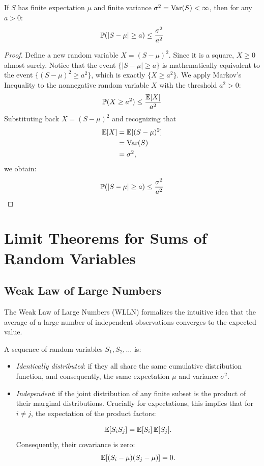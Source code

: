 \begin{theorem}
If $S$ has finite expectation $\mu$ and finite variance $\sigma^2 = \operatorname{Var}(S) < \infty$, then for any $a > 0$:
\begin{equation}
\mathbb{P}(|S - \mu| \geq a) \leq \frac{\sigma^2}{a^2}
\end{equation}

\end{theorem}

\begin{proof}
Define a new random variable $X = (S - \mu)^2$. Since it is a square, $X \geq 0$ almost surely.
Notice that the event $\{|S - \mu| \geq a\}$ is mathematically equivalent to the event $\{(S - \mu)^2 \geq a^2\}$, which is exactly $\{X \geq a^2\}$.
We apply Markov's Inequality to the nonnegative random variable $X$ with the threshold $a^2 > 0$:
\begin{equation}
\mathbb{P}(X \geq a^2) \leq \frac{\operatorname{\mathbb{E}}[X]}{a^2}
\end{equation}
Substituting back $X = (S - \mu)^2$ and recognizing that
\[
\begin{aligned}
\operatorname{\mathbb{E}}[X] &= \operatorname{\mathbb{E}}[(S - \mu)^2] \\
&= \operatorname{Var}(S) \\
&= \sigma^2,
\end{aligned}
\]
we obtain:
\begin{equation}
\mathbb{P}(|S - \mu| \geq a) \leq \frac{\sigma^2}{a^2}
\end{equation}

\end{proof}

\section{Limit Theorems for Sums of Random Variables}

\subsection{Weak Law of Large Numbers}

The Weak Law of Large Numbers (WLLN) formalizes the intuitive idea that the average of a large number of independent observations converges to the expected value.

\begin{definition}
A sequence of random variables $S_1, S_2, \dots$ is:
\begin{itemize}
\item \textit{Identically distributed}: if they all share the same cumulative distribution function, and consequently, the same expectation $\mu$ and variance $\sigma^2$.
\item \textit{Independent}: if the joint distribution of any finite subset is the product of their marginal distributions. Crucially for expectations, this implies that for $i \neq j$, the expectation of the product factors:

\[
\operatorname{\mathbb{E}}[S_i S_j] = \operatorname{\mathbb{E}}[S_i]\operatorname{\mathbb{E}}[S_j].
\]
Consequently, their covariance is zero:
\[
\operatorname{\mathbb{E}}[(S_i - \mu)(S_j - \mu)] = 0.
\]

\end{itemize}
\end{definition}

